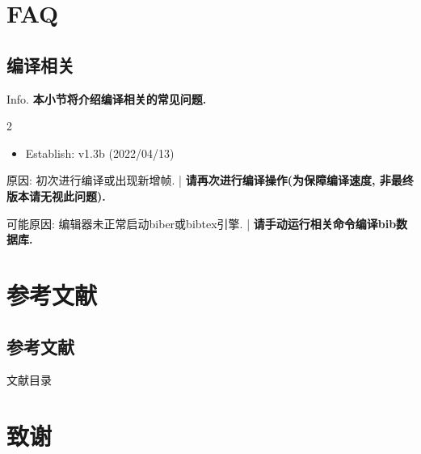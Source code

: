 \documentclass[hyperref, UTF8, CJK, aspectratio=169]{beamer}
\begin{document}
\section{FAQ}
\subsection{编译相关}
\begin{frame}{Info.}
  \textbf{本小节将介绍编译相关的常见问题.}
  \begin{multicols}{2}
    \begin{itemize}
      \item Establish: \textcolor{scugreen}{v1.3b (2022/04/13)}
    \end{itemize}
  \end{multicols}
  \mycopyright
\end{frame}

\begin{frame}[allowframebreaks]
  \par
  原因: 初次进行编译或出现新增帧. | \textbf{请再次进行编译操作(为保障编译速度, 非最终版本请无视此问题).}\par\vspace{2ex}
  \par
  可能原因: 编辑器未正常启动biber或bibtex引擎. | \textbf{请手动运行相关命令编译bib数据库.}\par\vspace{2ex}
\end{frame}

\section{参考文献}
\subsection{参考文献}
\begin{frame}[allowframebreaks]{文献目录}
	\nocite{*}
	\printbibliography[heading=none]
\end{frame}

\section{致谢}
\end{document}
